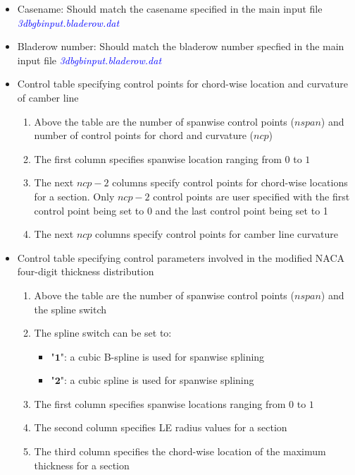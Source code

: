 \documentclass[8pt]{article}
\begin{document}
\noindent
\begin{itemize}[leftmargin=*]
    \item Casename: Should match the casename specified in the main input file \textit{\textcolor{blue}{3dbgbinput.bladerow.dat}}
    \item Bladerow number: Should match the bladerow number specfied in the main input file \textit{\textcolor{blue}{3dbgbinput.bladerow.dat}}
    \item Control table specifying control points for chord-wise location and curvature of camber line
    \begin{enumerate}[label=\alph*]
        \item Above the table are the number of spanwise control points ($nspan$) and number of control points for chord and curvature ($ncp$)
        \item The first column specifies spanwise location ranging from $0$ to $1$
        \item The next $ncp - 2$ columns specify control points for chord-wise locations for a section. Only $ncp - 2$ control points are user specified with the first control point being set to 0 and the last control point being set to 1
        \item The next $ncp$ columns specify control points for camber line curvature
    \end{enumerate}
    \item Control table specifying control parameters involved in the modified NACA four-digit thickness distribution
    \begin{enumerate}[label=\alph*]
        \item Above the table are the number of spanwise control points ($nspan$) and the spline switch
        \item The spline switch can be set to:
        \begin{itemize}[label=\FilledSmallSquare]
            \item "$\mathbf{1}$": a cubic B-spline is used for spanwise splining
            \item "$\mathbf{2}$": a cubic spline is used for spanwise splining
        \end{itemize}
        \item The first column specifies spanwise locations ranging from $0$ to $1$
        \item The second column specifies LE radius values for a section
        \item The third column specifies the chord-wise location of the maximum thickness for a section

\end{enumerate}
\end{itemize}
\end{document}
